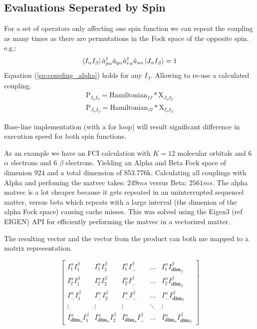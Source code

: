 \documentclass[12p]{article}
\begin{document}
\subsection{Evaluations Seperated by Spin}

For a set of operators only affecting one spin function we can repeat the coupling as many times as there are permutations in the Fock space of the opposite spin. e.g.:
\begin{equation} \label{eq:coupling_alpha}
  \bra{I_\alpha I_\beta} \hat{a}^{\dagger}_{p \alpha} \hat{a}_{q \alpha} \hat{a}^{\dagger}_{r \alpha} \hat{a}_{s \alpha} \ket{J_\alpha I_\beta} = 1
\end{equation}
Equation (\ref{eq:coupling_alpha}) holds for any $I_\beta$.
Allowing to re-use a calculated coupling.
\begin{align}
  \text{P}_{I_\alpha I_\beta} = \text{Hamiltonian}_{IJ} * \text{X}_{J_\alpha I_\beta} \\
  \text{P}_{J_\alpha I_\beta} = \text{Hamiltonian}_{JI} * \text{X}_{I_\alpha I_\beta}
\end{align}

Base-line implementation (with a for loop) will result significant difference in execution speed for both spin functions.

As an example we have an FCI calculation with $K=12$ molecular orbitals and 6 $\alpha$ electrons and 6 $\beta$ electrons.
Yielding an Alpha and Beta Fock space of dimenion 924 and a total dimension of 853.776k.
Calculating all couplings with Alpha and perfoming the matvec takes: $249 ms$ versus Beta: $2561 ms$.
The alpha matvec is a lot cheaper because it gets repeated in an uninterrupted sequencel matter, versus beta which repeats with a large interval (the dimenion of the alpha Fock space) causing cache misses. This was solved using the Eigen3 (ref EIGEN) API for efficiently performing the matvec in a vectorized matter.

The resulting vector and the vector from the product can both me mapped to a matrix representation.

  \begin{center}
\[
\begin{bmatrix}
    I^{\alpha}_1 I^{\beta}_1 & I^{\alpha}_1 I^{\beta}_2  & I^{\alpha}_1 I^{\beta}_{...} & \dots  & I^{\alpha}_1 I^{\beta}_{\textbf{dim}_\beta} \\
    I^{\alpha}_2 I^{\beta}_1 & I^{\alpha}_2 I^{\beta}_2  & I^{\alpha}_2 I^{\beta}_{...} & \dots  & I^{\alpha}_2 I^{\beta}_{\textbf{dim}_\beta} \\
    I^{\alpha}_{...} I^{\beta}_1 & I^{\alpha}_{...} I^{\beta}_2  & I^{\alpha}_{...} I^{\beta}_{...} & \dots  & I^{\alpha}_{...} I^{\beta}_{\textbf{dim}_\beta} \\
    \vdots & \vdots & \vdots & \ddots & \vdots \\
    I^{\alpha}_{\textbf{dim}_\alpha} I^{\beta}_1 & I^{\alpha}_{\textbf{dim}_\alpha} I^{\beta}_2  & I^{\alpha}_{\textbf{dim}_\alpha} I^{\beta}_{...} & \dots  &
    I^{\alpha}_{\textbf{dim}_\alpha} I^{\beta}_{\textbf{dim}_\beta}
\end{bmatrix}
\]
\end{center}
\end{document}
